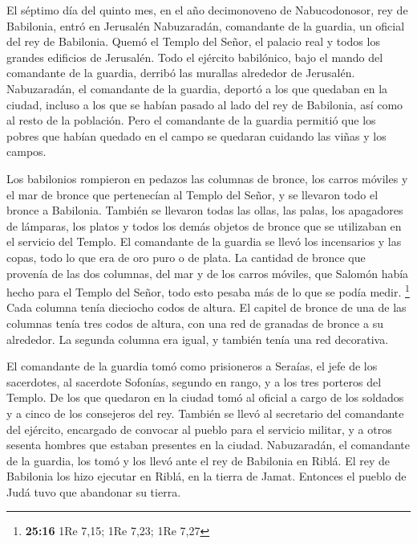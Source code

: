  El séptimo día del quinto mes, en el año decimonoveno de
Nabucodonosor, rey de Babilonia, entró en Jerusalén Nabuzaradán,
comandante de la guardia, un oficial del rey de Babilonia.
 Quemó el Templo del Señor, el palacio real y todos los
grandes edificios de Jerusalén.  Todo el ejército
babilónico, bajo el mando del comandante de la guardia, derribó las
murallas alrededor de Jerusalén.  Nabuzaradán, el
comandante de la guardia, deportó a los que quedaban en la ciudad,
incluso a los que se habían pasado al lado del rey de Babilonia, así
como al resto de la población.  Pero el comandante de la
guardia permitió que los pobres que habían quedado en el campo se
quedaran cuidando las viñas y los campos.

 Los babilonios rompieron en pedazos las columnas de
bronce, los carros móviles y el mar de bronce que pertenecían al Templo
del Señor, y se llevaron todo el bronce a Babilonia. 
También se llevaron todas las ollas, las palas, los apagadores de
lámparas, los platos y todos los demás objetos de bronce que se
utilizaban en el servicio del Templo.  El comandante de
la guardia se llevó los incensarios y las copas, todo lo que era de oro
puro o de plata.  La cantidad de bronce que provenía de
las dos columnas, del mar y de los carros móviles, que Salomón había
hecho para el Templo del Señor, todo esto pesaba más de lo que se podía
medir. \footnote{\textbf{25:16} 1Re 7,15; 1Re 7,23; 1Re 7,27}
 Cada columna tenía dieciocho codos de altura. El capitel
de bronce de una de las columnas tenía tres codos de altura, con una red
de granadas de bronce a su alrededor. La segunda columna era igual, y
también tenía una red decorativa.

 El comandante de la guardia tomó como prisioneros a
Seraías, el jefe de los sacerdotes, al sacerdote Sofonías, segundo en
rango, y a los tres porteros del Templo.  De los que
quedaron en la ciudad tomó al oficial a cargo de los soldados y a cinco
de los consejeros del rey. También se llevó al secretario del comandante
del ejército, encargado de convocar al pueblo para el servicio militar,
y a otros sesenta hombres que estaban presentes en la ciudad.
 Nabuzaradán, el comandante de la guardia, los tomó y los
llevó ante el rey de Babilonia en Riblá.  El rey de
Babilonia los hizo ejecutar en Riblá, en la tierra de Jamat. Entonces el
pueblo de Judá tuvo que abandonar su tierra.

